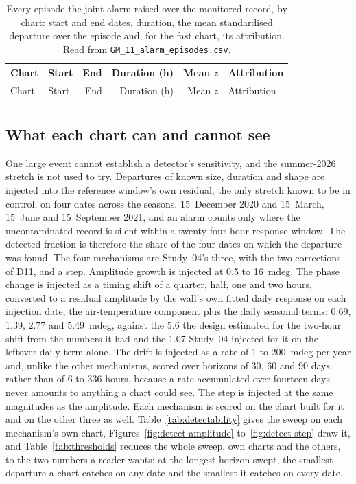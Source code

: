 \documentclass[11pt,a4paper]{article}
\begin{document}
{\scriptsize
\begin{longtable}{llrrrl}
\caption{Every episode the joint alarm raised over the monitored record, by
chart: start and end dates, duration, the mean standardised departure over
the episode and, for the fast chart, its attribution. Read from
\texttt{GM\_11\_alarm\_episodes.csv}.}
\label{tab:episodes}\\
\toprule
Chart & Start & End & Duration (h) & Mean $z$ & Attribution \\
\midrule
\endfirsthead
\toprule
Chart & Start & End & Duration (h) & Mean $z$ & Attribution \\
\midrule
\endhead
\bottomrule
\endfoot
\\
\end{longtable}}

\subsection{What each chart can and cannot see}

One large event cannot establish a detector's sensitivity, and the summer-2026
stretch is not used to try. Departures of known size, duration and shape are
injected into the reference window's own residual, the only stretch known to
be in control, on four dates across the seasons, 15~December 2020 and 15~March,
15~June and 15~September 2021, and an alarm counts only where the
uncontaminated record is silent within a twenty-four-hour response window. The
detected fraction is therefore the share of the four dates on which the
departure was found. The four mechanisms are Study~04's three, with the two
corrections of D11, and a step. Amplitude growth is injected at 0.5 to 16~mdeg.
The phase change is injected as a timing shift of a quarter, half, one and two
hours, converted to a residual amplitude by the wall's own fitted daily
response on each injection date, the air-temperature component plus the daily
seasonal terms: 0.69, 1.39, 2.77 and 5.49~mdeg, against the 5.6 the design
estimated for the two-hour shift from the numbers it had and the 1.07
Study~04 injected for it on the leftover daily term alone. The drift is
injected as a rate of 1 to 200~mdeg per year and, unlike the other mechanisms,
scored over horizons of 30, 60 and 90 days rather than of 6 to 336 hours,
because a rate accumulated over fourteen days never amounts to anything a
chart could see. The step is injected at the same magnitudes as the amplitude.
Each mechanism is scored on the chart built for it and on the other three as
well. Table~\ref{tab:detectability} gives the sweep on each mechanism's own
chart, Figures~\ref{fig:detect-amplitude} to~\ref{fig:detect-step} draw it,
and Table~\ref{tab:thresholds} reduces the whole sweep, own charts and the
others, to the two numbers a reader wants: at the longest horizon swept, the
smallest departure a chart catches on any date and the smallest it catches on
every date.
\end{document}
